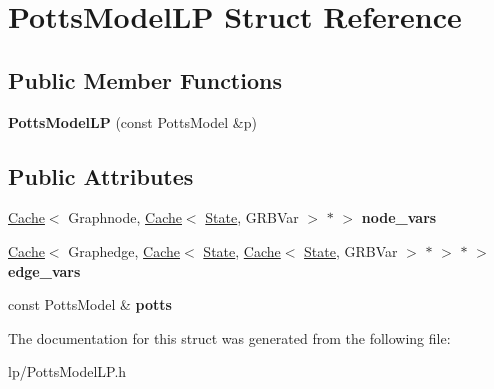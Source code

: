 \hypertarget{struct_potts_model_l_p}{
\section{PottsModelLP Struct Reference}
\label{struct_potts_model_l_p}
}
\subsection*{Public Member Functions}
\begin{DoxyCompactItemize}
\item 
\hypertarget{struct_potts_model_l_p_af041b236eacf847879e1a2ba53b6e987}{
{\bfseries PottsModelLP} (const PottsModel \&p)}
\label{struct_potts_model_l_p_af041b236eacf847879e1a2ba53b6e987}

\end{DoxyCompactItemize}
\subsection*{Public Attributes}
\begin{DoxyCompactItemize}
\item 
\hypertarget{struct_potts_model_l_p_ac572d15bc61963f636a39e752951cf31}{
\hyperlink{class_cache}{Cache}$<$ Graphnode, \hyperlink{class_cache}{Cache}$<$ \hyperlink{struct_state}{State}, GRBVar $>$ $\ast$ $>$ {\bfseries node\_\-vars}}
\label{struct_potts_model_l_p_ac572d15bc61963f636a39e752951cf31}

\item 
\hypertarget{struct_potts_model_l_p_a00e3418b717ea5c1a0334dc30dafcdcc}{
\hyperlink{class_cache}{Cache}$<$ Graphedge, \hyperlink{class_cache}{Cache}$<$ \hyperlink{struct_state}{State}, \hyperlink{class_cache}{Cache}$<$ \hyperlink{struct_state}{State}, GRBVar $>$ $\ast$ $>$ $\ast$ $>$ {\bfseries edge\_\-vars}}
\label{struct_potts_model_l_p_a00e3418b717ea5c1a0334dc30dafcdcc}

\item 
\hypertarget{struct_potts_model_l_p_ad829fe7b19ca64ae117303082784d110}{
const PottsModel \& {\bfseries potts}}
\label{struct_potts_model_l_p_ad829fe7b19ca64ae117303082784d110}

\end{DoxyCompactItemize}


The documentation for this struct was generated from the following file:\begin{DoxyCompactItemize}
\item 
lp/PottsModelLP.h\end{DoxyCompactItemize}
